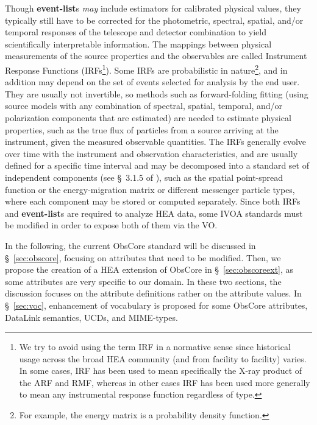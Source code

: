 \documentclass[11pt,a4paper]{ivoa}
\begin{document}
Though {\bf event-list}s {\em may\/} include estimators for calibrated physical values, they typically still have to be corrected for the photometric, spectral, spatial, and/or temporal responses of the telescope and detector combination to yield scientifically interpretable information. The mappings between physical measurements of the source properties and the observables are called Instrument Response Functions (\glspl{IRF}\footnote{We try to avoid using the term \gls{IRF} in a normative sense since historical usage across the broad \gls{HEA} community (and from facility to facility) varies. In some cases, \gls{IRF} has been used to mean specifically the X-ray product of the \gls{ARF} and \gls{RMF}, whereas in other cases \gls{IRF} has been used more generally to mean any instrumental response function regardless of type.}).  Some \glspl{IRF} are probabilistic in nature\footnote{For example, the energy matrix is a probability density function.}, and in addition may depend on the set of events selected for analysis by the end user.  They are usually not invertible, so methods such as forward-folding fitting (using source models with any combination of spectral, spatial, temporal, and/or polarization components that are estimated) are needed to estimate physical properties, such as the true flux of particles from a source arriving at the instrument, given the measured observable quantities. The \glspl{IRF} generally evolve over time with the instrument and observation characteristics, and are usually defined for a specific time interval and may be decomposed into a standard set of independent components (see \S~3.1.5 of \citep{2024ivoa.note.heig}), such as the spatial point-spread function or the energy-migration matrix or different messenger particle types, where each component may be stored or computed separately.  Since both \glspl{IRF} and {\bf event-list}s are required to analyze \gls{HEA} data, some \gls{IVOA} standards must be modified in order to expose both of them via the \gls{VO}.

In the following, the current ObsCore standard will be discussed in \S~\ref{sec:obscore}, focusing on attributes that need to be modified. Then, we propose the creation of a \gls{HEA} extension of ObsCore in \S~\ref{sec:obscoreext}, as some attributes are very specific to our domain. In these two sections, the discussion focuses on the attribute definitions rather on the attribute values. In \S~\ref{sec:voc}, enhancement of vocabulary is proposed for some ObsCore attributes, DataLink semantics, UCDs, and MIME-types.
\end{document}
